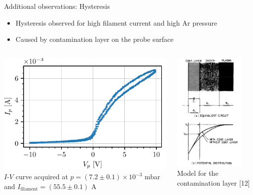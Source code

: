 \documentclass[10pt]{beamer}
\newcommand{\filamentcurrent}{\ensuremath{I_{\mathrm{filament}}}}
\begin{document}
\begin{frame}{Additional observations: Hysteresis}
    \begin{itemize}
        \item Hysteresis observed for high filament current and high Ar pressure
        \item Caused by contamination layer on the probe surface 
    \end{itemize}
    \vspace{-0.5cm}
    \begin{columns}[b]
        \begin{center}
            \includegraphics[scale=1]{../figures/hysteresis.pdf}\\
            \small $I$-$V$ curve acquired at $p = (7.2 \pm 0.1) \times 10^{-3}$ mbar and $\filamentcurrent = (55.5 \pm 0.1)$ A
        \end{center}

        \begin{center}
            \includegraphics[width=3.5cm]{../figures/contamination_layer.png}\\
            \small Model for the contamination layer [12]
        \end{center}
        
    \end{columns}

\end{frame}
\end{document}
